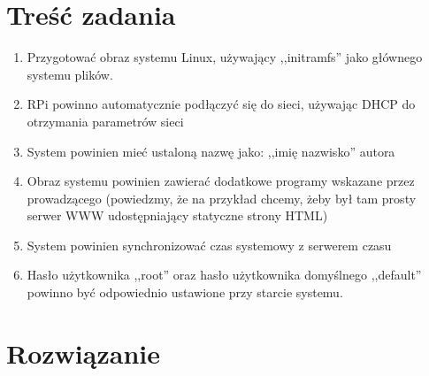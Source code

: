 
\usepackage{listings}

\maketitle
\tableofcontents
\newpage

\section{Treść zadania}
\begin{enumerate}
\item Przygotować obraz systemu Linux, używający ,,initramfs'' jako głównego systemu plików.
\item RPi powinno automatycznie podłączyć się do sieci, używając DHCP do otrzymania parametrów sieci
\item System powinien mieć ustaloną nazwę jako: ,,imię nazwisko'' autora
\item Obraz systemu powinien zawierać dodatkowe programy wskazane przez prowadzącego (powiedzmy, że na przykład chcemy, żeby był tam prosty serwer WWW udostępniający statyczne strony HTML)
\item System powinien synchronizować czas systemowy z serwerem czasu
\item Hasło użytkownika ,,root'' oraz hasło użytkownika domyślnego ,,default'' powinno być odpowiednio ustawione przy starcie systemu.
\end{enumerate}

\section{Rozwiązanie}

